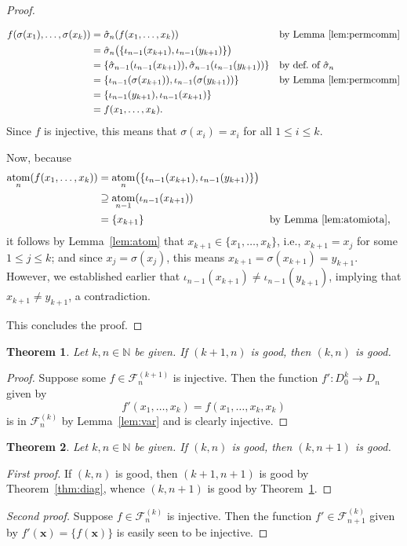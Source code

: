 \documentclass[a4paper,12pt]{article}
\newtheorem{theorem}{Theorem}[section]
\theoremstyle{definition}
\theoremstyle{remark}
\newcommand{\fset}[2]{\mathcal F^{(#1)}_{#2}}
\newcommand{\N}{\mathbb N}
\DeclareMathOperator{\atom}{atom}
\begin{document}
\begin{proof}
\begin{itemize}
        \begin{align*}
            f(\sigma(x_1), \dots, \sigma(x_k)) &= \hat\sigma_n(f(x_1, \dots, x_k)) &&\text{by Lemma~\ref{lem:permcomm}}\\
            &= \hat\sigma_n\big(\{\iota_{n-1}(x_{k+1}), \iota_{n-1}(y_{k+1})\}\big)\\
            &= \{\hat\sigma_{n-1}(\iota_{n-1}(x_{k+1})), \hat\sigma_{n-1}(\iota_{n-1}(y_{k+1}))\} &&\text{by def.\ of }\hat\sigma_n\\
            &= \{\iota_{n-1}(\sigma(x_{k+1})), \iota_{n-1}(\sigma(y_{k+1}))\} &&\text{by Lemma~\ref{lem:permcomm}}\\
            &= \{\iota_{n-1}(y_{k+1}), \iota_{n-1}(x_{k+1})\}\\
            &= f(x_1, \dots, x_k).
        \end{align*}
        Since $f$ is injective, this means that $\sigma(x_i) = x_i$ for all $1 \leq i \leq k$.

        Now, because
        \begin{align*}
            \atom_n(f(x_1, \dots, x_k)) &= \atom_n\!\big(\{\iota_{n-1}(x_{k+1}), \iota_{n-1}(y_{k+1})\}\big)\\
            &\supseteq \atom_{n-1}(\iota_{n-1}(x_{k+1}))\\
            &= \{x_{k+1}\} &&\text{by Lemma~\ref{lem:atomiota}},
        \end{align*}
        it follows by Lemma~\ref{lem:atom} that $x_{k+1} \in \{x_1, \dots, x_k\}$, i.e., $x_{k+1} = x_j$ for some $1 \leq j \leq k$; and since $x_j = \sigma(x_j)$, this means $x_{k+1} = \sigma(x_{k+1}) = y_{k+1}$. However, we established earlier that $\iota_{n-1}(x_{k+1}) \neq \iota_{n-1}(y_{k+1})$, implying that $x_{k+1} \neq y_{k+1}$, a contradiction.
    \end{itemize}
    This concludes the proof.
\end{proof}

\begin{theorem}\label{thm:left}
    Let $k, n \in \N$ be given. If $(k+1, n)$ is good, then $(k, n)$ is good.
\end{theorem}
\begin{proof}
    Suppose some $f \in \fset {k+1}n$ is injective. Then the function $f' : D_0^k \to D_n$ given by
    \[f'(x_1, \dots, x_k) = f(x_1, \dots, x_k, x_k)\]
    is in $\fset kn$ by Lemma~\ref{lem:var} and is clearly injective.
\end{proof}

\begin{theorem}\label{thm:up}
    Let $k, n \in \N$ be given. If $(k, n)$ is good, then $(k, n+1)$ is good.
\end{theorem}
\begin{proof}[First proof]
    If $(k, n)$ is good, then $(k+1, n+1)$ is good by Theorem~\ref{thm:diag}, whence $(k, n+1)$ is good by Theorem~\ref{thm:left}.
\end{proof}
\begin{proof}[Second proof]
    Suppose $f \in \fset kn$ is injective. Then the function $f' \in \fset k{n+1}$ given by $f'(\mathbf x) = \{f(\mathbf x)\}$ is easily seen to be injective.
\end{proof}
\end{document}
